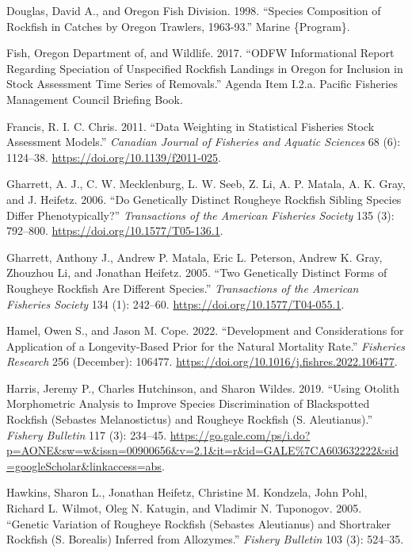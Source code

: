 \documentclass[
]{scrartcl}
\newlength{\cslhangindent}
\newenvironment{CSLReferences}[2] %
 {\begin{list}{}{%
  \setlength{\itemindent}{0pt}
  \setlength{\leftmargin}{0pt}
  \setlength{\parsep}{0pt}
  \ifodd #1
   \setlength{\leftmargin}{\cslhangindent}
   \setlength{\itemindent}{-1\cslhangindent}
  \fi
  \setlength{\itemsep}{#2\baselineskip}}}
 {\end{list}}
\begin{document}
\begin{CSLReferences}{1}{0}
Douglas, David A., and Oregon Fish Division. 1998. {``Species
Composition of Rockfish in Catches by {Oregon} Trawlers, 1963-93.''}
Marine \{Program\}.

Fish, Oregon Department of, and Wildlife. 2017. {``ODFW Informational
Report Regarding Speciation of Unspecified Rockfish Landings in Oregon
for Inclusion in Stock Assessment Time Series of Removals.''} Agenda
Item I.2.a. Pacific Fisheries Management Council Briefing Book.

Francis, R. I. C. Chris. 2011. {``Data Weighting in Statistical
Fisheries Stock Assessment Models.''} \emph{Canadian Journal of
Fisheries and Aquatic Sciences} 68 (6): 1124--38.
\url{https://doi.org/10.1139/f2011-025}.

Gharrett, A. J., C. W. Mecklenburg, L. W. Seeb, Z. Li, A. P. Matala, A.
K. Gray, and J. Heifetz. 2006. {``Do {Genetically} {Distinct} {Rougheye}
{Rockfish} {Sibling} {Species} {Differ} {Phenotypically}?''}
\emph{Transactions of the American Fisheries Society} 135 (3): 792--800.
\url{https://doi.org/10.1577/T05-136.1}.

Gharrett, Anthony J., Andrew P. Matala, Eric L. Peterson, Andrew K.
Gray, Zhouzhou Li, and Jonathan Heifetz. 2005. {``Two {Genetically}
{Distinct} {Forms} of {Rougheye} {Rockfish} {Are} {Different}
{Species}.''} \emph{Transactions of the American Fisheries Society} 134
(1): 242--60. \url{https://doi.org/10.1577/T04-055.1}.

Hamel, Owen S., and Jason M. Cope. 2022. {``Development and
Considerations for Application of a Longevity-Based Prior for the
Natural Mortality Rate.''} \emph{Fisheries Research} 256 (December):
106477. \url{https://doi.org/10.1016/j.fishres.2022.106477}.

Harris, Jeremy P., Charles Hutchinson, and Sharon Wildes. 2019. {``Using
Otolith Morphometric Analysis to Improve Species Discrimination of
Blackspotted Rockfish ({Sebastes} Melanostictus) and Rougheye Rockfish
({S}. Aleutianus).''} \emph{Fishery Bulletin} 117 (3): 234--45.
\url{https://go.gale.com/ps/i.do?p=AONE&sw=w&issn=00900656&v=2.1&it=r&id=GALE\%7CA603632222&sid=googleScholar&linkaccess=abs}.

Hawkins, Sharon L., Jonathan Heifetz, Christine M. Kondzela, John Pohl,
Richard L. Wilmot, Oleg N. Katugin, and Vladimir N. Tuponogov. 2005.
{``Genetic Variation of Rougheye Rockfish ({Sebastes} Aleutianus) and
Shortraker Rockfish ({S}. Borealis) Inferred from Allozymes.''}
\emph{Fishery Bulletin} 103 (3): 524--35.


\end{CSLReferences}
\end{document}
